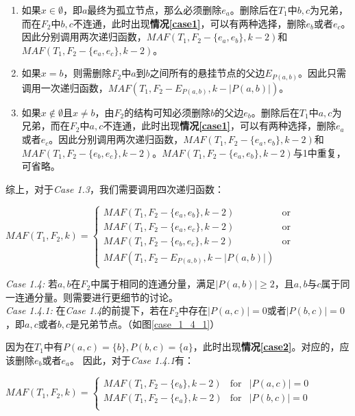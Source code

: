 \begin{enumerate}
	\item 如果$x \in \emptyset$，即$a$最终为孤立节点，那么必须删除$e_a$。删除后在$T_1$中$b,c$为兄弟，而在$F_2$中$b,c$不连通，此时出现\textbf{情况\ref{case1}}，可以有两种选择，删除$e_b$或者$e_c$。因此分别调用两次递归函数，$MAF(T_1,F_2-\{e_a,e_b\},k-2)$和$MAF(T_1,F_2-\{e_a,e_c\},k-2)$。
	\item 如果$x = b$，则需删除$F_2$中$a$到$b$之间所有的悬挂节点的父边$E_{P(a,b)}$。因此只需调用一次递归函数，$MAF(T_1,F_2-E_{P(a,b)},k-|P(a,b)|)$。
	\item 如果$x \notin \emptyset$且$x \neq b$，由$F_2$的结构可知必须删除$b$的父边$e_b$。删除后在$T_1$中$a,c$为兄弟，而在$F_2$中$a,c$不连通，此时出现\textbf{情况\ref{case1}}，可以有两种选择，删除$e_a$或者$e_c$。因此分别调用两次递归函数，$MAF(T_1,F_2-\{e_a,e_b\},k-2)$和$MAF(T_1,F_2-\{e_b,e_c\},k-2)$。$MAF(T_1,F_2-\{e_a,e_b\},k-2)$与1中重复，可省略。\\
\end{enumerate}
综上，对于\textit{Case 1.3}，我们需要调用四次递归函数：
\begin{center}
$MAF(T_1,F_2,k) = \left\{
\begin{array}{lr}
         MAF(T_1,F_2-\{e_a,e_b\},k-2) & \mbox{or}\\ 
         MAF(T_1,F_2-\{e_a,e_c\},k-2) & \mbox{or}\\
         MAF(T_1,F_2-\{e_b,e_c\},k-2) & \mbox{or}\\
         MAF(T_1,F_2-E_{P(a,b)},k-|P(a,b)|) & 
\end{array}
\right.$
\end{center}

\textit{Case 1.4: }若$a,b$在$F_2$中属于相同的连通分量，满足$|P(a,b)| \ge 2$，且$a,b$与$c$属于同一连通分量。则需要进行更细节的讨论。
$ $\\

\textit{Case 1.4.1: }在\textit{Case 1.4}的前提下，若在$F_2$中存在$|P(a,c)|=0$或者$|P(b,c)|=0$，即$a,c$或者$b,c$是兄弟节点。（如图\ref{case_1_4_1}）

因为在$T_1$中有$P(a,c)=\{b\},P(b,c)=\{a\}$，此时出现\textbf{情况\ref{case2}}。对应的，应该删除$e_b$或者$e_a$。
因此，对于\textit{Case 1.4.1}有：
\begin{center}
$MAF(T_1,F_2,k) = \left\{
\begin{array}{lcl}
         MAF(T_1,F_2-\{e_b\},k-2) & \mbox{for} & |P(a,c)|=0\\ 
         MAF(T_1,F_2-\{e_a\},k-2) & \mbox{for} & |P(b,c)|=0\\
\end{array}
\right.$
\end{center}
$  $\\

